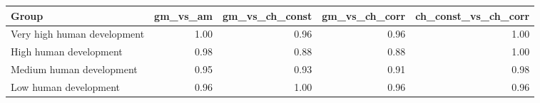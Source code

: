 \begin{table}[ht]
\centering
\begin{tabular}{lrrrr}
  \hline
Group & gm\_vs\_am & gm\_vs\_ch\_const & gm\_vs\_ch\_corr & ch\_const\_vs\_ch\_corr \\
  \hline
Very high human development & 1.00 & 0.96 & 0.96 & 1.00 \\
  High human development & 0.98 & 0.88 & 0.88 & 1.00 \\
  Medium human development & 0.95 & 0.93 & 0.91 & 0.98 \\
  Low human development & 0.96 & 1.00 & 0.96 & 0.96 \\
   \hline
\end{tabular}
\end{table}
